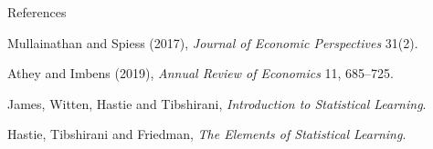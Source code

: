 \documentclass[aspectratio=169,11pt]{beamer}
\newenvironment{wideitemize}{\itemize\addtolength{\itemsep}{9pt}}{\enditemize}
\begin{document}
\begin{frame}{References}
\small
\begin{wideitemize}
  \item Mullainathan and Spiess (2017), \emph{Journal of Economic Perspectives} 31(2).
  \item Athey and Imbens (2019), \emph{Annual Review of Economics} 11, 685--725.
  \item James, Witten, Hastie and Tibshirani, \emph{Introduction to Statistical Learning}.
  \item Hastie, Tibshirani and Friedman, \emph{The Elements of Statistical Learning}.
\end{wideitemize}
\end{frame}
\end{document}
